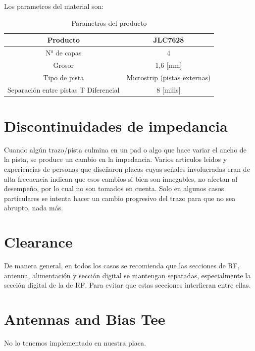 \documentclass[a4paper,12pt]{report} %
\begin{document}
Los parametros del material son: 

\begin{table} [H]
	\begin{center}
		\begin{tabular}{|c||c|}
			\hline
			Producto		& JLC7628  \\ \hline
			N° de capas			& 4	 \\ \hline
			Grosor	& 1,6 [mm]		\\ \hline
			Tipo de pista & Microstrip (pistas externas) \\ \hline
			Separación entre pistas T Diferencial & 8 [mills] \\ \hline
		\end{tabular}
		\caption{Parametros del producto}
		\label{placa}
	\end{center}
\end{table}


\section{Discontinuidades de impedancia}

Cuando algún trazo/pista culmina en un pad o algo que hace variar el ancho de la pista, se produce un cambio en la impedancia. Varios articulos leidos y experiencias de personas que diseñaron placas cuyas señales involucradas eran de alta frecuencia indican que esos cambios si bien son innegables, no afectan al desempeño, por lo cual no son tomados en cuenta. Solo en algunos casos particulares se intenta hacer un cambio progresivo del trazo para que no sea abrupto, nada más. 

\section{Clearance}

De manera general, en todos los casos se recomienda que las secciones de RF, antenna, alimentación y sección digital se mantengan separadas, especialmente la sección digital de la de RF. Para evitar que estas secciones interfieran entre ellas.

\section{Antennas and Bias Tee}

No lo tenemos implementado en nuestra placa.
\end{document}
